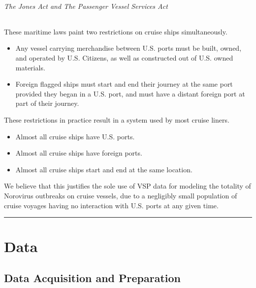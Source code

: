 \documentclass[
  11,
]{book}
\providecommand{\tightlist}{%
  \setlength{\itemsep}{0pt}\setlength{\parskip}{0pt}}
\begin{document}
\hypertarget{the-jones-act-and-the-passenger-vessel-services-act}{%
\paragraph*{The Jones Act and The Passenger Vessel Services Act}\label{the-jones-act-and-the-passenger-vessel-services-act}}

These maritime laws paint two restrictions on cruise ships simultaneously.

\begin{itemize}
\item
  Any vessel carrying merchandise between U.S. ports must be built, owned, and operated by U.S. Citizens, as well as constructed out of U.S. owned materials.
\item
  Foreign flagged ships must start and end their journey at the same port provided they began in a U.S. port, and must have a distant foreign port at part of their journey.
\end{itemize}

These restrictions in practice result in a system used by most cruise liners.

\begin{itemize}
\tightlist
\item
  Almost all cruise ships have U.S. ports.
\item
  Almost all cruise ships have foreign ports.
\item
  Almost all cruise ships start and end at the same location.
\end{itemize}

We believe that this justifies the sole use of VSP data for modeling the totality of Norovirus outbreaks on cruise vessels, due to a negligibly small population of cruise voyages having no interaction with U.S. ports at any given time.

\begin{center}\rule{0.5\linewidth}{0.5pt}\end{center}

\hypertarget{part-data}{%
\part{Data}\label{part-data}}

\hypertarget{data-acquisition-and-preparation}{%
\chapter*{Data Acquisition and Preparation}\label{data-acquisition-and-preparation}}
\end{document}
